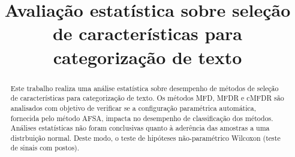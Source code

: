 \documentclass[conference]{IEEEtran}
\begin{document}
%
\title{\vspace{0.25in}Avaliação estatística sobre seleção de características para categorização de texto}



\author{
}

\maketitle

\begin{abstract}
Este trabalho realiza uma análise estatística sobre desempenho de métodos de seleção de características para categorização de texto. Os métodos MFD, MFDR e cMFDR são analisados com objetivo de verificar se a configuração paramétrica automática, fornecida pelo método AFSA, impacta no desempenho de classificação dos métodos. Análises estatísticas não foram conclusivas quanto à aderência das amostras a uma distrbuição normal. Deste modo, o teste de hipóteses não-paramétrico Wilcoxon (teste de sinais com postos).
\end{abstract}

\IEEEpeerreviewmaketitle

\end{document}
